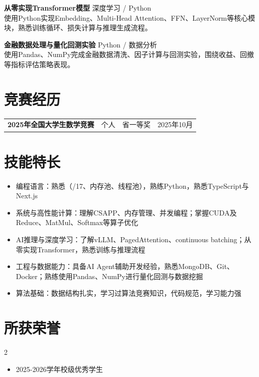 \vspace{0.8em}
{\large{\textbf{从零实现Transformer模型}}} \hfill {深度学习 / Python}\\
使用Python实现Embedding、Multi-Head Attention、FFN、LayerNorm等核心模块，熟悉训练循环、损失计算与推理生成流程。

\vspace{0.8em}
{\large{\textbf{金融数据处理与量化回测实验}}} \hfill {Python / 数据分析}\\
使用Pandas、NumPy完成金融数据清洗、因子计算与回测实验，围绕收益、回撤等指标评估策略表现。

\section{\makebox[\widthof{\faTrophy}][c]{\color{HIT_Blue}{\faTrophy}}\quad 竞赛经历}
\vspace{-1em}
\begin{table}[h!]
    \begin{tabularx}{\textwidth}{Xp{}p{}p{}}
        \textbf{2025年全国大学生数学竞赛} & 个人 & 省一等奖 & 2025年10月 \\
    \end{tabularx}
\end{table}

\section{\makebox[\widthof{\faWrench}][c]{\color{HIT_Blue}{\faWrench}}\quad 技能特长}
\vspace{0.5em}
\begin{itemize}
    \item 编程语言：熟悉\Cpp（/17、内存池、线程池），熟练Python，熟悉TypeScript与Next.js
    \item 系统与高性能计算：理解CSAPP、内存管理、并发编程；掌握CUDA及Reduce、MatMul、Softmax等算子优化
    \item AI推理与深度学习：了解vLLM、PagedAttention、continuous batching；从零实现Transformer，熟悉训练与推理流程
    \item 工程与数据能力：具备AI Agent辅助开发经验，熟悉MongoDB、Git、Docker；熟练使用Pandas、NumPy进行量化回测与数据挖掘
    \item 算法基础：数据结构扎实，学习过算法竞赛知识，代码规范，学习能力强
\end{itemize}

\section{\makebox[\widthof{\faStar}][c]{\color{HIT_Blue}{\faStar}}\quad 所获荣誉}
\vspace{-1em}
\begin{multicols}{2}
    \begin{itemize}
        \item 2025-2026学年校级优秀学生
    \end{itemize}
\end{multicols}


